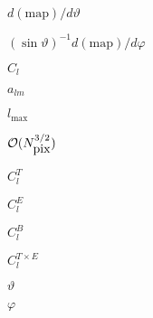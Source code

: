 \documentclass{article}
\begin{document}
$d (\mbox{map})/d\vartheta$
\pagebreak

$(\sin\vartheta)^{-1}d(\mbox{map})/d\varphi$
\pagebreak

$C_l$
\pagebreak

$a_{lm}$
\pagebreak

$l_{\mbox{max}}$
\pagebreak

${\cal {O}}(N_{\mbox{pix}}^{3/2})$
\pagebreak

$C^T_l$
\pagebreak

$C^E_l$
\pagebreak

$C^B_l$
\pagebreak

$C^{T\times E}_l$
\pagebreak

$\vartheta$
\pagebreak

$\varphi$
\pagebreak
\end{document}
